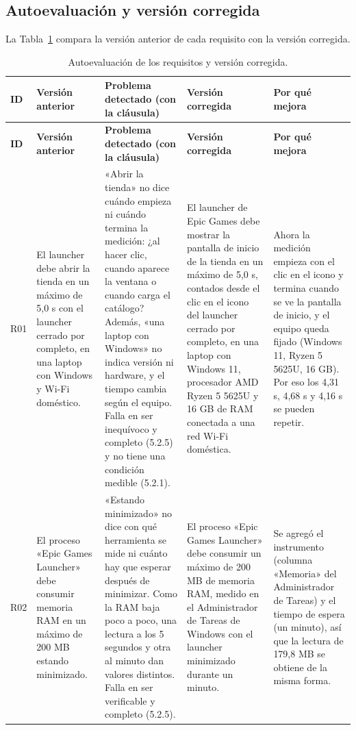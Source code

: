 \documentclass[10pt,a4paper]{article}
\begin{document}
\begin{landscape}
\section{Autoevaluaci\'on y versi\'on corregida}
La Tabla~\ref{tab:autoeval} compara la versi\'on anterior de cada requisito con la versi\'on corregida.

\begingroup\scriptsize\setlength{\tabcolsep}{2.5pt}\renewcommand{\arraystretch}{1.05}
\begin{longtable}{|>{\raggedright\arraybackslash}p{1cm}|>{\raggedright\arraybackslash}p{5.6cm}|>{\raggedright\arraybackslash}p{5.6cm}|>{\raggedright\arraybackslash}p{7.4cm}|>{\raggedright\arraybackslash}p{5.0cm}|}
\caption{Autoevaluación de los requisitos y versión corregida.}\label{tab:autoeval}\\
\hline\rowcolor{hdr}\textbf{ID} & \textbf{Versión anterior} & \textbf{Problema detectado (con la cláusula)} & \textbf{Versión corregida} & \textbf{Por qué mejora} \\ \hline
\endfirsthead
\hline\rowcolor{hdr}\textbf{ID} & \textbf{Versión anterior} & \textbf{Problema detectado (con la cláusula)} & \textbf{Versión corregida} & \textbf{Por qué mejora} \\ \hline
\endhead
R01 & El launcher debe abrir la tienda en un máximo de 5,0 s con el launcher cerrado por completo, en una laptop con Windows y Wi-Fi doméstico. & «Abrir la tienda» no dice cuándo empieza ni cuándo termina la medición: ¿al hacer clic, cuando aparece la ventana o cuando carga el catálogo? Además, «una laptop con Windows» no indica versión ni hardware, y el tiempo cambia según el equipo. Falla en ser inequívoco y completo (5.2.5) y no tiene una condición medible (5.2.1). & El launcher de Epic Games debe mostrar la pantalla de inicio de la tienda en un máximo de 5,0 s, contados desde el clic en el icono del launcher cerrado por completo, en una laptop con Windows 11, procesador AMD Ryzen 5 5625U y 16 GB de RAM conectada a una red Wi-Fi doméstica. & Ahora la medición empieza con el clic en el icono y termina cuando se ve la pantalla de inicio, y el equipo queda fijado (Windows 11, Ryzen 5 5625U, 16 GB). Por eso los 4,31 s, 4,68 s y 4,16 s se pueden repetir. \\ \hline
R02 & El proceso «Epic Games Launcher» debe consumir memoria RAM en un máximo de 200 MB estando minimizado. & «Estando minimizado» no dice con qué herramienta se mide ni cuánto hay que esperar después de minimizar. Como la RAM baja poco a poco, una lectura a los 5 segundos y otra al minuto dan valores distintos. Falla en ser verificable y completo (5.2.5). & El proceso «Epic Games Launcher» debe consumir un máximo de 200 MB de memoria RAM, medido en el Administrador de Tareas de Windows con el launcher minimizado durante un minuto. & Se agregó el instrumento (columna «Memoria» del Administrador de Tareas) y el tiempo de espera (un minuto), así que la lectura de 179,8 MB se obtiene de la misma forma. \\ \hline

\end{longtable}
\end{landscape}
\end{document}
